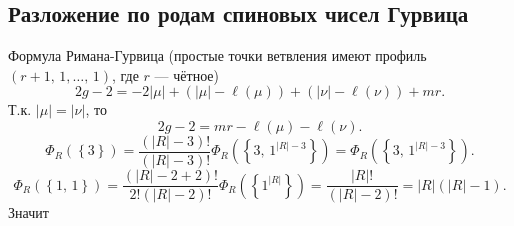 \documentclass[a5paper,twoside]{article}
\numberwithin{equation}{section}
\begin{document}
\subsection{Разложение по родам спиновых чисел Гурвица}
Формула Римана-Гурвица (простые точки ветвления имеют профиль $(r+1,\,1,\ldots,\,1)$, где $r$ --- чётное)
\[
	2g-2=-2|\mu|+\left( |\mu|-\ell\left(\mu\right) \right) +
	\left( |\nu|-\ell\left(\nu\right) \right)+m r 
.\] 
Т.\:к. $|\mu|=|\nu|$, то
 \[
	 2g-2=mr- \ell(\mu)- \ell(\nu)
.\] 
\[
	\Phi_R(\left\{ 3 \right\} )= 
	\frac{\left( |R|-3 \right) !}{\left( |R|-3 \right) !}\Phi_{R}\left( \left\{ 3,\,1^{|R|-3} \right\}  \right) =\Phi_R\left( \left\{ 3,\,1^{|R|-3} \right\}  \right) 
.\] 
\[
	\Phi_R\left( \left\{ 1,\,1 \right\}  \right) =
	\frac{\left( |R|-2+2 \right) !}{2!\left( |R|-2 \right) !}\Phi_{R}\left( \left\{ 1^{|R|} \right\}  \right)=
	\frac{|R|!}{ (|R|-2)!}=|R|\left(|R|-1\right)
.\] 
Значит
\end{document}
